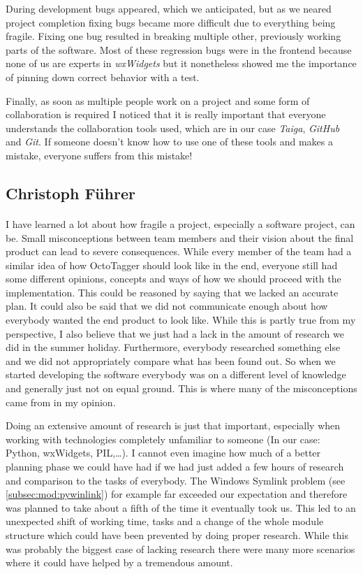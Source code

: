 During development bugs appeared, which we anticipated, but as we neared
project completion fixing bugs became more difficult due to everything being
fragile. Fixing one bug resulted in breaking multiple other, previously working
parts of the software. Most of these regression bugs were in the frontend
because none of us are experts in \emph{wxWidgets} but it nonetheless showed me the
importance of pinning down correct behavior with a test.

Finally, as soon as multiple people work on a project and some form of
collaboration is required I noticed that it is really important that everyone
understands the collaboration tools used, which are in our case \emph{Taiga},
\emph{GitHub} and \emph{Git}. If someone doesn't know how to use one of
these tools and makes a mistake, everyone suffers from this mistake!

\subsection{Christoph Führer}

\paragraph{}
I have learned a lot about how fragile a project, especially a software project,
can be. Small misconceptions between team members and their vision about the
final product can lead to severe consequences. While every member of the
team had a similar idea of how OctoTagger should look like in the end, everyone
still had some different opinions, concepts and ways of how we should proceed with
the implementation. This could be reasoned by saying that we lacked an accurate
plan. It could also be said that we did not communicate enough about how
everybody wanted the end product to look like. While this is partly true from my
perspective, I also believe that we just had a lack in the amount of research we
did in the summer holiday. Furthermore, everybody researched something else and we did
not appropriately compare what has been found out. So when we started developing
the software everybody was on a different level of knowledge and generally just
not on equal ground. This is where many of the misconceptions came from in my
opinion.

Doing an extensive amount of research is just that important, especially when
working with technologies completely unfamiliar to someone (In our case: Python,
wxWidgets, PIL,\ldots). I cannot even imagine how much of a better planning
phase we could have had if we had just added a few hours of research and
comparison to the tasks of everybody. The Windows Symlink problem (see
\cref{subsec:mod:pywinlink}) for example far exceeded our expectation
and therefore was planned to take about a fifth of the time it eventually took
us. This led to an unexpected shift of working time, tasks and a change of the
whole module structure which could have been prevented by doing proper research.
While this was probably the biggest case of lacking research there were many
more scenarios where it could have helped by a tremendous amount.

